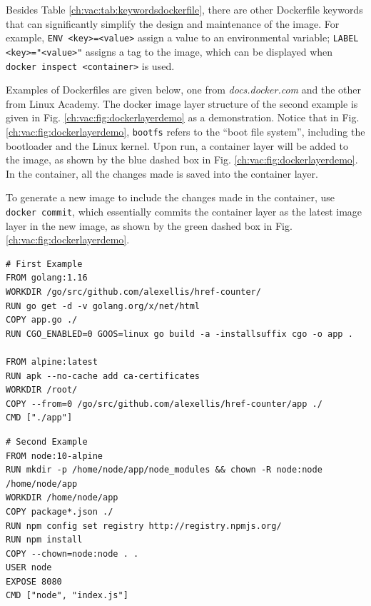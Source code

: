 Besides Table \ref{ch:vac:tab:keywordsdockerfile}, there are other Dockerfile keywords that can significantly simplify the design and maintenance of the image. For example, \verb|ENV <key>=<value>| assign a value to an environmental variable; \verb|LABEL <key>="<value>"| assigns a tag to the image, which can be displayed when \verb|docker inspect <container>| is used.

Examples of Dockerfiles are given below, one from \textit{docs.docker.com} and the other from Linux Academy. The docker image layer structure of the second example is given in Fig. \ref{ch:vac:fig:dockerlayerdemo} as a demonstration. Notice that in Fig. \ref{ch:vac:fig:dockerlayerdemo}, \verb|bootfs| refers to the ``boot file system'', including the bootloader and the Linux kernel. Upon run, a container layer will be added to the image, as shown by the blue dashed box in Fig. \ref{ch:vac:fig:dockerlayerdemo}. In the container, all the changes made is saved into the container layer.

To generate a new image to include the changes made in the container, use \verb|docker commit|, which essentially commits the container layer as the latest image layer in the new image, as shown by the green dashed box in Fig. \ref{ch:vac:fig:dockerlayerdemo}.

\begin{lstlisting}
# First Example
FROM golang:1.16
WORKDIR /go/src/github.com/alexellis/href-counter/
RUN go get -d -v golang.org/x/net/html
COPY app.go ./
RUN CGO_ENABLED=0 GOOS=linux go build -a -installsuffix cgo -o app .

FROM alpine:latest
RUN apk --no-cache add ca-certificates
WORKDIR /root/
COPY --from=0 /go/src/github.com/alexellis/href-counter/app ./
CMD ["./app"]
\end{lstlisting}

\begin{lstlisting}
# Second Example
FROM node:10-alpine
RUN mkdir -p /home/node/app/node_modules && chown -R node:node /home/node/app
WORKDIR /home/node/app
COPY package*.json ./
RUN npm config set registry http://registry.npmjs.org/
RUN npm install
COPY --chown=node:node . .
USER node
EXPOSE 8080
CMD ["node", "index.js"]
\end{lstlisting}

